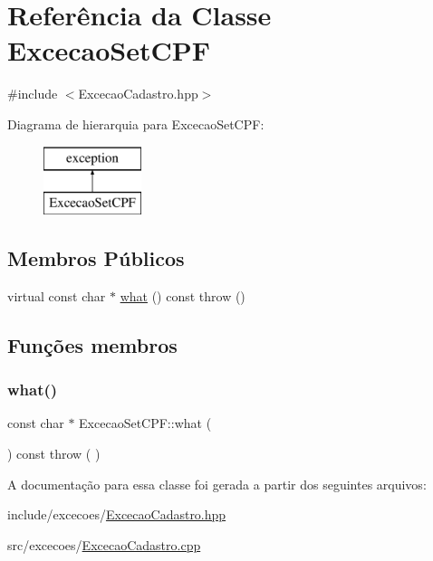 \hypertarget{class_excecao_set_c_p_f}{}\section{Referência da Classe Excecao\+Set\+C\+PF}
\label{class_excecao_set_c_p_f}


{\ttfamily \#include $<$Excecao\+Cadastro.\+hpp$>$}

Diagrama de hierarquia para Excecao\+Set\+C\+PF\+:\begin{figure}[H]
\begin{center}
\leavevmode
\includegraphics[height=2.000000cm]{class_excecao_set_c_p_f}
\end{center}
\end{figure}
\subsection*{Membros Públicos}
\begin{DoxyCompactItemize}
\item 
virtual const char $\ast$ \mbox{\hyperlink{class_excecao_set_c_p_f_a3128d5f9073d647f665081c612d6cf41}{what}} () const  throw ()
\end{DoxyCompactItemize}


\subsection{Funções membros}
\mbox{\label{class_excecao_set_c_p_f_a3128d5f9073d647f665081c612d6cf41}} 
\subsubsection{\texorpdfstring{what()}{what()}}
{\footnotesize\ttfamily const char $\ast$ Excecao\+Set\+C\+P\+F\+::what (\begin{DoxyParamCaption}{ }\end{DoxyParamCaption}) const throw ( ) \hspace{0.3cm}{\ttfamily [virtual]}}



A documentação para essa classe foi gerada a partir dos seguintes arquivos\+:\begin{DoxyCompactItemize}
\item 
include/excecoes/\mbox{\hyperlink{_excecao_cadastro_8hpp}{Excecao\+Cadastro.\+hpp}}\item 
src/excecoes/\mbox{\hyperlink{_excecao_cadastro_8cpp}{Excecao\+Cadastro.\+cpp}}\end{DoxyCompactItemize}
